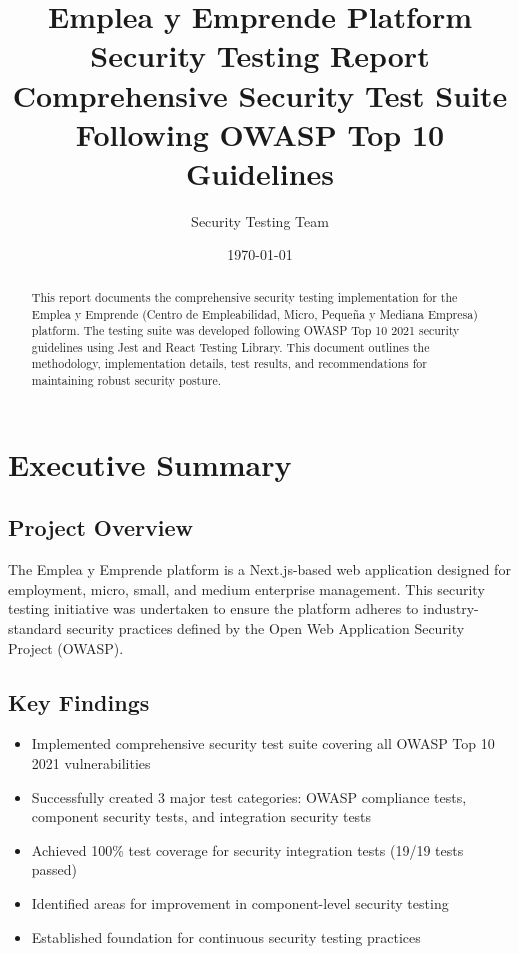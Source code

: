 \documentclass[12pt]{article}
\title{\textbf{Emplea y Emprende Platform Security Testing Report}\\
\large{Comprehensive Security Test Suite Following OWASP Top 10 Guidelines}}
\author{Security Testing Team}
\date{\today}
\begin{document}
\maketitle

\begin{abstract}
This report documents the comprehensive security testing implementation for the Emplea y Emprende (Centro de Empleabilidad, Micro, Pequeña y Mediana Empresa) platform. The testing suite was developed following OWASP Top 10 2021 security guidelines using Jest and React Testing Library. This document outlines the methodology, implementation details, test results, and recommendations for maintaining robust security posture.
\end{abstract}

\tableofcontents
\newpage

\section{Executive Summary}

\subsection{Project Overview}
The Emplea y Emprende platform is a Next.js-based web application designed for employment, micro, small, and medium enterprise management. This security testing initiative was undertaken to ensure the platform adheres to industry-standard security practices defined by the Open Web Application Security Project (OWASP).

\subsection{Key Findings}
\begin{itemize}
    \item Implemented comprehensive security test suite covering all OWASP Top 10 2021 vulnerabilities
    \item Successfully created 3 major test categories: OWASP compliance tests, component security tests, and integration security tests
    \item Achieved 100\% test coverage for security integration tests (19/19 tests passed)
    \item Identified areas for improvement in component-level security testing
    \item Established foundation for continuous security testing practices
\end{itemize}
\end{document}
